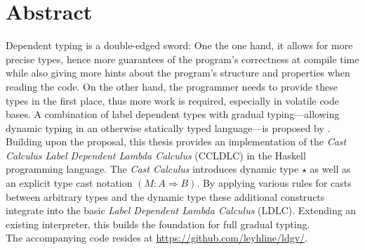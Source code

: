 \chapter*{Abstract}

Dependent typing is a double-edged sword: One the one hand, it allows for more precise types, hence more guarantees of the program's correctness at compile time while also giving more hints about the program's structure and properties when reading the code. On the other hand, the programmer needs to provide these types in the first place, thus more work is required, especially in volatile code bases. A combination of label dependent types with gradual typing---allowing dynamic typing in an otherwise statically typed language---is proposed by \cite{fu2021}. Building upon the proposal, this thesis provides an implementation of the \emph{Cast Calculus Label Dependent Lambda Calculus} (CCLDLC) in the Haskell programming language. The \emph{Cast Calculus} introduces dynamic type $\star$ as well as an explicit type cast notation $(M : A \Rightarrow B)$. By applying various rules for casts between arbitrary types and the dynamic type these additional constructs integrate into the basic \emph{Label Dependent Lambda Calculus} (LDLC). Extending an existing interpreter, this builds the foundation for full gradual typting.
\\
The accompanying code resides at \url{https://github.com/leyhline/ldgv/}.
